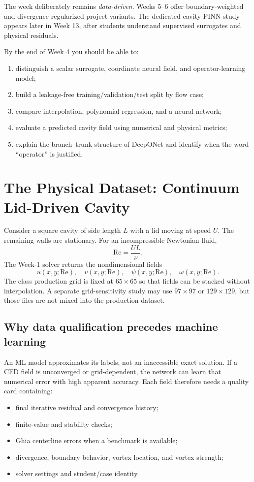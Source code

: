 \documentclass[11pt]{article}
\newcommand{\Rey}{\mathrm{Re}}
\begin{document}
The week deliberately remains \emph{data-driven}. Weeks 5--6 offer boundary-weighted and divergence-regularized project variants. The dedicated cavity PINN study appears later in Week 13, after students understand supervised surrogates and physical residuals.

\begin{learningbox}
By the end of Week 4 you should be able to:
\begin{enumerate}
\item distinguish a scalar surrogate, coordinate neural field, and operator-learning model;
\item build a leakage-free training/validation/test split by flow case;
\item compare interpolation, polynomial regression, and a neural network;
\item evaluate a predicted cavity field using numerical and physical metrics;
\item explain the branch--trunk structure of DeepONet and identify when the word ``operator'' is justified.
\end{enumerate}
\end{learningbox}

\section{The Physical Dataset: Continuum Lid-Driven Cavity}
Consider a square cavity of side length $L$ with a lid moving at speed $U$. The remaining walls are stationary. For an incompressible Newtonian fluid,
\begin{equation}
\Rey=\frac{UL}{\nu}.
\end{equation}
The Week-1 solver returns the nondimensional fields
\begin{equation}
u(x,y;\Rey),\quad v(x,y;\Rey),\quad \psi(x,y;\Rey),\quad \omega(x,y;\Rey).
\end{equation}
The class production grid is fixed at $65\times65$ so that fields can be stacked without interpolation. A separate grid-sensitivity study may use $97\times97$ or $129\times129$, but those files are not mixed into the production dataset.

\subsection{Why data qualification precedes machine learning}
An ML model approximates its labels, not an inaccessible exact solution. If a CFD field is unconverged or grid-dependent, the network can learn that numerical error with high apparent accuracy. Each field therefore needs a quality card containing:
\begin{itemize}
\item final iterative residual and convergence history;
\item finite-value and stability checks;
\item Ghia centerline errors when a benchmark is available;
\item divergence, boundary behavior, vortex location, and vortex strength;
\item solver settings and student/case identity.
\end{itemize}
\end{document}
